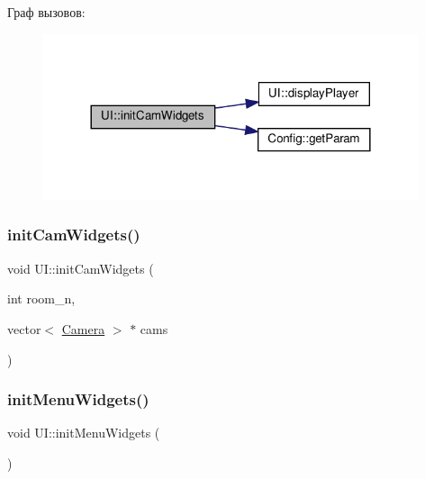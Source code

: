 Граф вызовов\+:\nopagebreak
\begin{figure}[H]
\begin{center}
\leavevmode
\includegraphics[width=312pt]{class_u_i_abc8966cc08826d39716b86e0a160af24_cgraph}
\end{center}
\end{figure}
\mbox{\label{class_u_i_abc8966cc08826d39716b86e0a160af24}} 
\subsubsection{\texorpdfstring{init\+Cam\+Widgets()}{initCamWidgets()}\hspace{0.1cm}{\footnotesize\ttfamily [2/2]}}
{\footnotesize\ttfamily void U\+I\+::init\+Cam\+Widgets (\begin{DoxyParamCaption}\item[{int}]{room\+\_\+n,  }\item[{vector$<$ \hyperlink{struct_camera}{Camera} $>$ $\ast$}]{cams }\end{DoxyParamCaption})\hspace{0.3cm}{\ttfamily [private]}}

\mbox{\label{class_u_i_ac1d0ed7af2a3272527c544110fc37890}} 
\subsubsection{\texorpdfstring{init\+Menu\+Widgets()}{initMenuWidgets()}\hspace{0.1cm}{\footnotesize\ttfamily [1/2]}}
{\footnotesize\ttfamily void U\+I\+::init\+Menu\+Widgets (\begin{DoxyParamCaption}{ }\end{DoxyParamCaption})\hspace{0.3cm}{\ttfamily [private]}}

